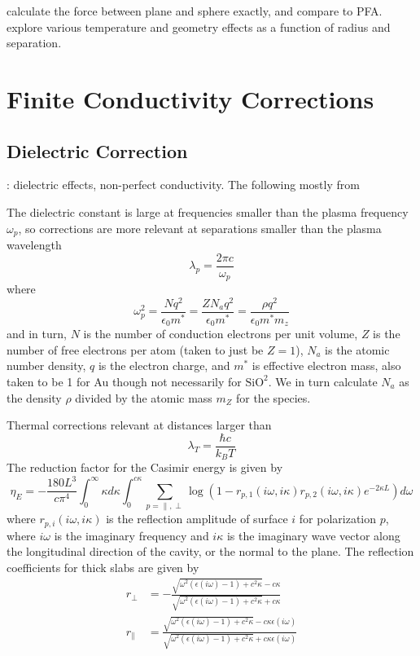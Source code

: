 \documentclass[11pt]{article}
\begin{document}
\citet{Bulgac} calculate the force between plane and sphere exactly, and compare to PFA. \citet{Durand} explore various temperature and geometry effects as a function of radius and separation. 

\section{Finite Conductivity Corrections}
\subsection{Dielectric Correction}
\citet{BeyondPFA,Lambrecht}: dielectric effects, non-perfect conductivity. The following mostly from \citet{Lambrecht}

The dielectric constant is large at frequencies smaller than the plasma frequency $\omega_p$, so corrections are more relevant at separations smaller than the plasma wavelength
$$
\lambda_p=\frac{2\pi c}{\omega_p}
$$
where
$$
\omega_p^2=\frac{Nq^2}{\epsilon_0m^*}=\frac{ZN_aq^2}{\epsilon_0m^*}=\frac{\rho q^2}{\epsilon_0m^*m_z}
$$
and in turn, $N$ is the number of conduction electrons per unit volume, $Z$ is the number of free electrons per atom (taken to just be $Z=1$), $N_a$ is the atomic number density, $q$ is the electron charge, and $m^*$ is effective electron mass, also taken to be 1 for Au though not necessarily for $\mathrm{SiO^2}$. We in turn calculate $N_a$ as the density $\rho$ divided by the atomic mass $m_Z$ for the species.

Thermal corrections relevant at distances larger than 
$$
\lambda_T=\frac{\hbar c}{k_B T}
$$
The reduction factor for the Casimir energy is given by
\begin{equation}
\eta_E=-\frac{180L^3}{c\pi^4}\int^{\infty}_{0}\kappa d\kappa\int^{c\kappa}_0\sum_{p=\parallel,\perp}\log{\left(1-r_{p,1}(i\omega,i\kappa)r_{p,2}(i\omega,i\kappa)e^{-2\kappa L}\right)}d\omega
\end{equation}
where $r_{p,i}(i\omega,i\kappa)$ is the reflection amplitude of surface $i$ for polarization $p$, where $i\omega$ is the imaginary frequency and $i\kappa$ is the imaginary wave vector along the longitudinal direction of the cavity, or the normal to the plane. The reflection coefficients for thick slabs are given by
\begin{align}
r_{\perp}&=-\frac{\sqrt{\omega^2(\epsilon(i\omega)-1)+c^2\kappa}-c\kappa}{\sqrt{\omega^2(\epsilon(i\omega)-1)+c^2\kappa}+c\kappa} \\
r_{\parallel}&=\frac{\sqrt{\omega^2(\epsilon(i\omega)-1)+c^2\kappa}-c\kappa\epsilon(i\omega)}{\sqrt{\omega^2(\epsilon(i\omega)-1)+c^2\kappa}+c\kappa\epsilon(i\omega)}
\end{align}
\end{document}
